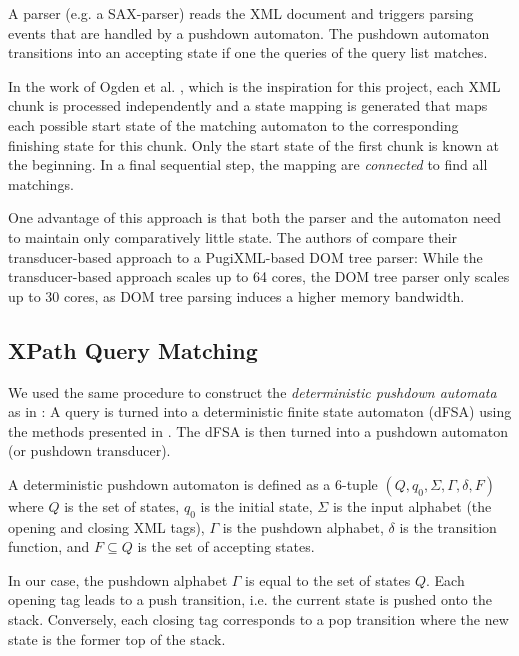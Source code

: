 A parser (e.g. a SAX-parser) reads the XML document and triggers parsing events
that are handled by a pushdown automaton. The pushdown automaton transitions
into an accepting state if one the queries of the query list matches.

In the work of Ogden et al. \cite{Ogden2013}, which is the inspiration for this
project, each XML chunk is processed independently and a state mapping is
generated that maps each possible start state of the matching automaton to the
corresponding finishing state for this chunk. Only the start state of the first
chunk is known at the beginning. In a final sequential step, the mapping are
\emph{connected} to find all matchings.

One advantage of this approach is that both the parser and the automaton need
to maintain only comparatively little state. The authors of \cite{Ogden2013}
compare their transducer-based approach to a PugiXML-based DOM tree parser:
While the transducer-based approach scales up to 64 cores, the DOM tree parser
only scales up to 30 cores, as DOM tree parsing induces a higher memory
bandwidth. 

\subsection{XPath Query Matching}
We used the same procedure to construct the \emph{deterministic pushdown
automata} as in \cite{Ogden2013}: A query is turned into a deterministic finite
state automaton (dFSA) using the methods presented in \cite{Green2014}. The
dFSA is then turned into a pushdown automaton (or pushdown transducer).

A deterministic pushdown automaton is defined as a 6-tuple $(Q, q_0, \Sigma,
\Gamma, \delta, F)$ where $Q$ is the set of states, $q_0$ is the initial state,
$\Sigma$ is the input alphabet (the opening and closing XML tags), $\Gamma$ is
the pushdown alphabet, $\delta$ is the transition function, and $F \subseteq Q$ is
the set of accepting states.

In our case, the pushdown alphabet $\Gamma$ is equal to the set of states $Q$.
Each opening tag leads to a push transition, i.e. the current state is pushed
onto the stack. Conversely, each closing tag corresponds to a pop transition
where the new state is the former top of the stack.


